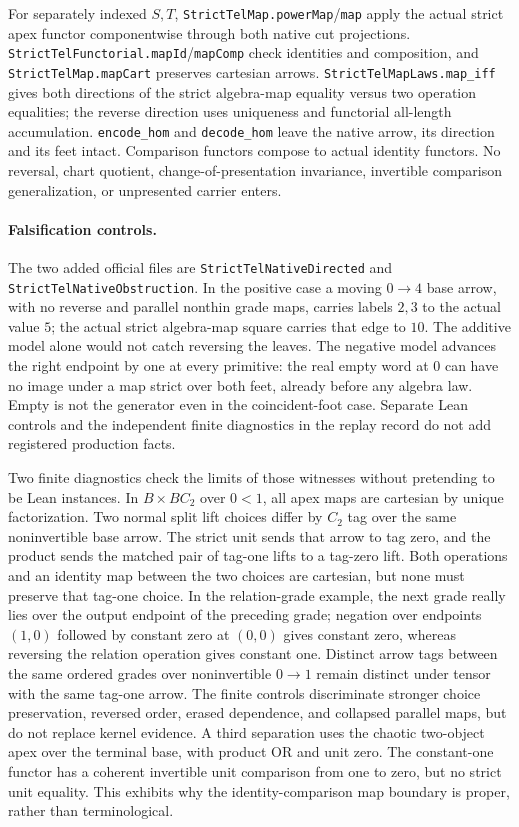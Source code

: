 \documentclass[11pt]{article}
\newcommand{\code}[1]{\texttt{#1}}
\begin{document}
For separately indexed \(S,T\), \code{StrictTelMap.powerMap}/\code{map} apply the actual strict apex functor componentwise through both native cut projections. \code{StrictTelFunctorial.mapId}/\code{mapComp} check identities and composition, and \code{StrictTelMap.mapCart} preserves cartesian arrows. \code{StrictTelMapLaws.map\_iff} gives both directions of the strict algebra-map equality versus two operation equalities; the reverse direction uses uniqueness and functorial all-length accumulation. \code{encode\_hom} and \code{decode\_hom} leave the native arrow, its direction and its feet intact. Comparison functors compose to actual identity functors. No reversal, chart quotient, change-of-presentation invariance, invertible comparison generalization, or unpresented carrier enters.

\paragraph{Falsification controls.}
The two added official files are \code{StrictTelNativeDirected} and \code{StrictTelNativeObstruction}. In the positive case a moving \(0\to4\) base arrow, with no reverse and parallel nonthin grade maps, carries labels \(2,3\) to the actual value \(5\); the actual strict algebra-map square carries that edge to \(10\). The additive model alone would not catch reversing the leaves. The negative model advances the right endpoint by one at every primitive: the real empty word at \(0\) can have no image under a map strict over both feet, already before any algebra law. Empty is not the generator even in the coincident-foot case. Separate Lean controls and the independent finite diagnostics in the replay record do not add registered production facts.

Two finite diagnostics check the limits of those witnesses without pretending to be Lean instances. In \(B\times BC_2\) over \(0<1\), all apex maps are cartesian by unique factorization. Two normal split lift choices differ by \(C_2\) tag over the same noninvertible base arrow. The strict unit sends that arrow to tag zero, and the product sends the matched pair of tag-one lifts to a tag-zero lift. Both operations and an identity map between the two choices are cartesian, but none must preserve that tag-one choice. In the relation-grade example, the next grade really lies over the output endpoint of the preceding grade; negation over endpoints \((1,0)\) followed by constant zero at \((0,0)\) gives constant zero, whereas reversing the relation operation gives constant one. Distinct arrow tags between the same ordered grades over noninvertible \(0\to1\) remain distinct under tensor with the same tag-one arrow. The finite controls discriminate stronger choice preservation, reversed order, erased dependence, and collapsed parallel maps, but do not replace kernel evidence. A third separation uses the chaotic two-object apex over the terminal base, with product OR and unit zero. The constant-one functor has a coherent invertible unit comparison from one to zero, but no strict unit equality. This exhibits why the identity-comparison map boundary is proper, rather than terminological.
\end{document}
